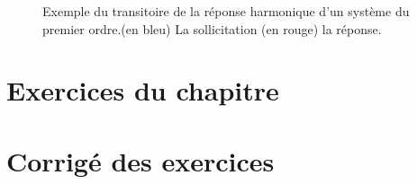 \begin{figure}[!h]
    \centering
    
    \caption{Exemple du transitoire de la réponse harmonique d'un système
    du premier ordre.(en bleu) La sollicitation (en rouge) la réponse.}
\end{figure}
\clearpage
\section{Exercices du chapitre}
\small

\setcounter{numexos}{0}
\normalsize
\newpage
\restoregeometry
\captionsetup{width=0.9\linewidth}
\section{Corrigé des exercices}
\small

\normalsize
\restoregeometry
\captionsetup{width=0.9\linewidth}
